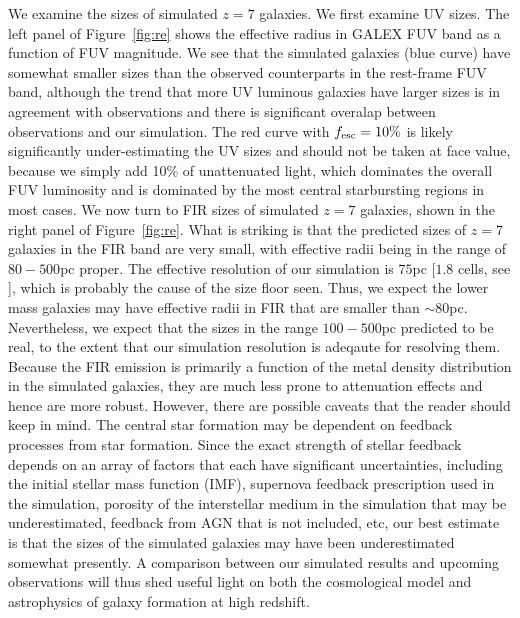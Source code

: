 We examine the sizes of simulated $z=7$ galaxies.
We first examine UV sizes.
The left panel of Figure~\ref{fig:re} shows the effective radius in GALEX FUV band as a function of FUV magnitude.
We see that the simulated galaxies (blue curve) have somewhat smaller sizes than the observed counterparts in the rest-frame FUV band,
although the trend that more UV luminous galaxies have larger sizes is in agreement with observations and
there is significant overalap between observations and our simulation.
The red curve with $f_{\rm esc}=10\%$ is likely significantly under-estimating the UV sizes and 
should not be taken at face value, because we simply add 10\% of unattenuated light, which dominates the overall FUV luminosity 
and is dominated by the most central starbursting regions in most cases.
We now turn to FIR sizes of simulated $z=7$ galaxies, 
shown in the right panel of Figure~\ref{fig:re}.
What is striking is that the predicted sizes of $z=7$ galaxies in the FIR band 
are very small, with effective radii being in the range of $80-500$pc proper.
The effective resolution of our simulation is $75$pc [$1.8$ cells, see \citet{2013bCen}],
which is probably the cause of the size floor seen.
Thus, we expect the lower mass galaxies may have effective radii in FIR 
that are smaller than $\sim 80$pc.
Nevertheless, we expect that the sizes in the range $100-500$pc predicted to be
real, to the extent that our simulation resolution is adeqaute for resolving them.
Because the FIR emission is primarily a function of the metal density distribution in the simulated galaxies,
they are much less prone to attenuation effects and hence are more robust.
However, there are possible caveats that the reader should keep in mind.
The central star formation may be dependent on feedback processes from star formation.
Since the exact strength of stellar feedback depends on an array of factors
that each have significant uncertainties, including the initial stellar mass function (IMF),
supernova feedback prescription used in the simulation, porosity of the interstellar medium
in the simulation that may be underestimated, feedback from AGN that is not included, etc,
our best estimate is that the sizes of the simulated galaxies may have been underestimated somewhat presently.
A comparison between our simulated results and upcoming observations will thus
shed useful light on both the cosmological model and astrophysics of galaxy formation at high redshift.


